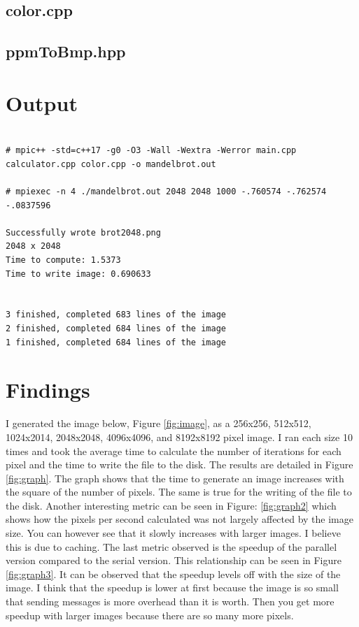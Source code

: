\documentclass{article}
\begin{document}
\subsection{color.cpp}


\subsection{ppmToBmp.hpp}

\newpage
\section*{Output}

\begin{lstlisting}[showstringspaces=false]

# mpic++ -std=c++17 -g0 -O3 -Wall -Wextra -Werror main.cpp calculator.cpp color.cpp -o mandelbrot.out

# mpiexec -n 4 ./mandelbrot.out 2048 2048 1000 -.760574 -.762574 -.0837596

Successfully wrote brot2048.png
2048 x 2048
Time to compute: 1.5373
Time to write image: 0.690633


3 finished, completed 683 lines of the image
2 finished, completed 684 lines of the image
1 finished, completed 684 lines of the image

\end{lstlisting}

\section*{Findings}

I generated the image below, Figure \ref{fig:image}, as a 256x256, 512x512, 1024x2014, 2048x2048, 4096x4096, and 8192x8192 pixel image. I ran each size 10 times and took the average time to calculate the number of iterations for each pixel and the time to write the file to the disk. The results are detailed in Figure \ref{fig:graph}. The graph shows that the time to generate an image increases with the square of the number of pixels. The same is true for the writing of the file to the disk. Another interesting metric can be seen in Figure: \ref{fig:graph2} which shows how the pixels per second calculated was not largely affected by the image size. You can however see that it slowly increases with larger images. I believe this is due to caching. The last metric observed is the speedup of the parallel version compared to the serial version. This relationship can be seen in Figure \ref{fig:graph3}. It can be observed that the speedup levels off with the size of the image. I think that the speedup is lower at first because the image is so small that sending messages is more overhead than it is worth. Then you get more speedup with larger images because there are so many more pixels. 
\end{document}
